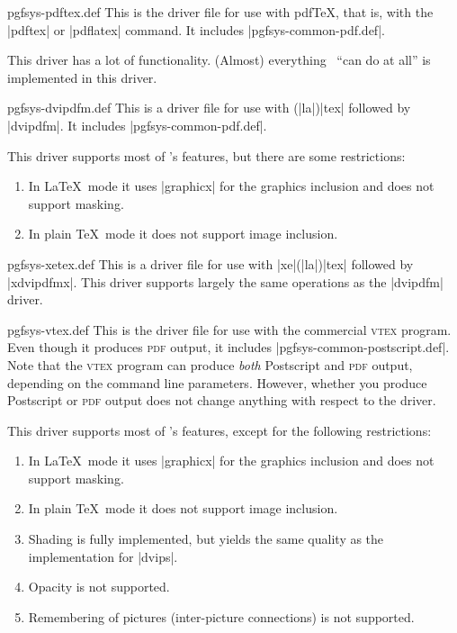 \begin{filedescription}{pgfsys-pdftex.def}
  This is the driver file for use with pdf\TeX, that is, with the
  |pdftex| or |pdflatex| command. It includes
  |pgfsys-common-pdf.def|.

  This driver has a lot of functionality. (Almost) everything
  \pgfname\ ``can do at all'' is implemented in this driver.
\end{filedescription}

\begin{filedescription}{pgfsys-dvipdfm.def}
  This is a driver file for use with (|la|)|tex| followed by |dvipdfm|. It
  includes |pgfsys-common-pdf.def|.

  This driver supports most of \pgfname's features, but there are some
  restrictions:
  \begin{enumerate}
  \item
    In \LaTeX\ mode it uses |graphicx| for the graphics
    inclusion and does not support masking.
  \item
    In plain \TeX\ mode it does not support image inclusion.
  \end{enumerate}
\end{filedescription}

\begin{filedescription}{pgfsys-xetex.def}
  This is a driver file for use with |xe|(|la|)|tex| followed by
  |xdvipdfmx|. This driver supports largely the same operations as the
  |dvipdfm| driver.
\end{filedescription}

\begin{filedescription}{pgfsys-vtex.def}
  This is the driver file for use with the commercial \textsc{vtex}
  program. Even though it produces  \textsc{pdf} output, it
  includes |pgfsys-common-postscript.def|. Note that the
  \textsc{vtex} program can produce \emph{both} Postscript and
  \textsc{pdf} output, depending on the command line
  parameters. However, whether you produce Postscript or
  \textsc{pdf} output does not change anything with respect to the
  driver.

  This driver supports most of \pgfname's features, except for
  the following restrictions:
  \begin{enumerate}
  \item
    In \LaTeX\ mode it uses |graphicx| for the graphics
    inclusion and does not support masking.
  \item
    In plain \TeX\ mode it does not support image inclusion.
  \item
    Shading is fully implemented, but yields the same quality as the
    implementation for |dvips|.
  \item
    Opacity is not supported.
  \item
    Remembering of pictures (inter-picture connections) is not
    supported.
  \end{enumerate}
\end{filedescription}


